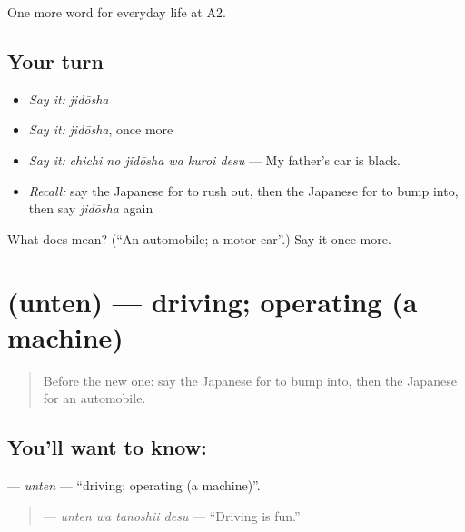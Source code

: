 \begin{grammarlens}[title={What you've built}]
One more word for everyday life at A2.
\end{grammarlens}

\subsection*{Your turn}
\begin{itemize}
\raggedright
  \item \emph{Say it:} \emph{jidōsha}
  \item \emph{Say it:} \emph{jidōsha}, once more
  \item \emph{Say it:} \emph{chichi no jidōsha wa kuroi desu} — My father's car is black.
  \item \emph{Recall:} say the Japanese for to rush out, then the Japanese for to bump into, then say \emph{jidōsha} again
\end{itemize}

\begin{tcolorbox}[breakable,colback=teal!4,colframe=teal!35!black,title={Before you move on}]
What does  mean? (\textquotedblleft{}An automobile; a motor car\textquotedblright{}.) Say it once more.
\end{tcolorbox}
\section[\texorpdfstring{\ja{うんてん} (unten)}{うんてん (unten)}]{ (unten) — driving; operating (a machine)}

\label{lesson:JA-C202-unten}



\begin{quote}
Before the new one: say the Japanese for to bump into, then the Japanese for an automobile.
\end{quote}

\subsection*{You'll want to know: }
\textbf{} — \emph{unten} — \textquotedblleft{}driving; operating (a machine)\textquotedblright{}.

\begin{quote}
\textbf{ } — \emph{unten wa tanoshii desu} — \textquotedblleft{}Driving is fun.\textquotedblright{}
\end{quote}

